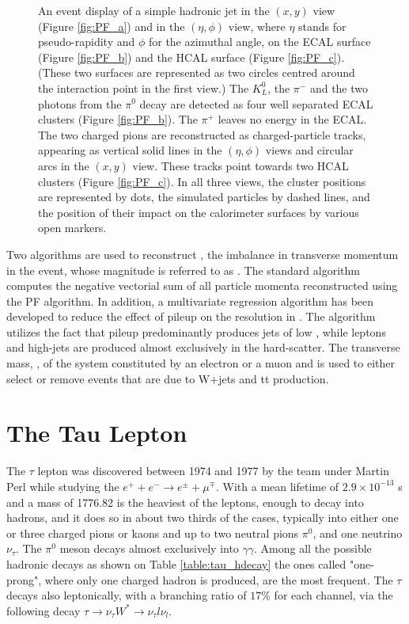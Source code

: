 \begin{figure}
	\caption{An event display of a simple hadronic jet in the $(x, y)$ view (Figure \ref{fig:PF_a}) and in the $(\eta,\phi)$ view, where $\eta$ stands for pseudo-rapidity and $\phi$ for the azimuthal angle, on the ECAL surface (Figure \ref{fig:PF_b}) and the HCAL surface (Figure \ref{fig:PF_c}). (These two surfaces are represented as two circles centred around the interaction point in the first view.) The $K^{0}_{L}$, the $\pi^{-}$ and the two photons from the $\pi^{0}$ decay are detected as four well separated ECAL clusters (Figure \ref{fig:PF_b}). The $\pi^{+}$ leaves no energy in the ECAL. The two charged pions are reconstructed as charged-particle tracks, appearing as vertical solid lines in the $(\eta,\phi)$ views and circular arcs in the $(x, y)$ view. These tracks point towards two HCAL clusters (Figure \ref{fig:PF_c}). In all three views, the cluster positions are represented by dots, the simulated particles by dashed lines, and the position of their impact on the calorimeter surfaces by various open markers.}
	\label{fig:PF_event_display}
\end{figure}

Two algorithms are used to reconstruct \ptvecmiss, the imbalance in transverse momentum in the event, whose magnitude is referred to as \met. The standard algorithm computes the negative vectorial sum of all particle momenta reconstructed using the PF algorithm. In addition, a multivariate regression algorithm \cite{Khachatryan:2014gga} has been developed to reduce the effect of pileup on the resolution in \met. The algorithm utilizes the fact that pileup predominantly produces jets of low \pt, while leptons and high-\pt jets are produced almost exclusively in the hard-scatter. The transverse mass, \mt, of the system constituted by an electron or a muon and \met is used to either select or remove events that are due to W+jets and tt production. 

\clearpage

\section {The Tau Lepton}

The $\tau$ lepton was discovered between 1974 and 1977 by the team under Martin Perl while studying the $e^{+}+e^{-}\longrightarrow e^{\pm}+\mu^{\mp}$. With a mean lifetime of $2.9\times10^{−13}$ s and a mass of 1776.82 \mev \cite{Agashe:2014kda} is the heaviest of the leptons, enough to decay into hadrons, and it does so in about two thirds of the cases, typically into either one or three charged pions or kaons and up to two neutral pions \ensuremath{\pi^{0}}, and one neutrino \ensuremath{\nu_{\tau}}. The \ensuremath{\pi^{0}} meson decays almost exclusively into \ensuremath{\gamma\gamma}. Among all the possible hadronic decays as shown on Table \ref{table:tau_hdecay} the ones called "one-prong", where only one charged hadron is produced, are the most frequent. The $\tau$ decays also leptonically, with a branching ratio of $17\%$ for each channel, via the following decay $\tau\longrightarrow\nu_{\tau}W^{*}\longrightarrow\nu_{\tau}l\nu_{l}$.

